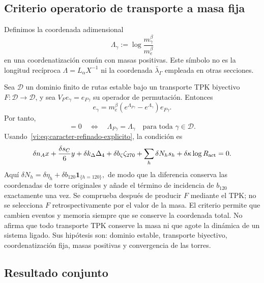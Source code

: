\subsection{Criterio operatorio de transporte a masa fija}

Definimos la coordenada adimensional
\begin{equation}
 \Lambda_\gamma:=\log\frac{m_\gamma^\beta}{m_e^\beta}
 \label{vi:eq:lambda-masa-ruta}
\end{equation}
en una coordenatización común con masas positivas. Este símbolo no es la longitud
recíproca $\Lambda=L_\alpha X^{-1}$ ni la coordenada
$\bar\lambda_\Gamma$ empleada en otras secciones.

Sea $\mathscr D$ un dominio finito de rutas estable bajo un transporte TPK
biyectivo $F:\mathscr D\to\mathscr D$, y sea
$V_Fe_\gamma=e_{F\gamma}$ su operador de permutación. Entonces
\begin{equation}
 [M^\beta,V_F]e_\gamma
 =m_e^\beta\left(e^{\Lambda_{F\gamma}}-e^{\Lambda_\gamma}\right)
 e_{F\gamma}.
 \label{vi:eq:conmutador-masa-transporte}
\end{equation}
Por tanto,
\begin{equation}
 [M^\beta,V_F]=0
 \quad\Longleftrightarrow\quad
 \Lambda_{F\gamma}=\Lambda_\gamma
 \quad\text{para toda }\gamma\in\mathscr D.
 \label{vi:eq:criterio-conservacion-masa}
\end{equation}
Usando~\eqref{vi:eq:caracter-refinado-explicito}, la condición es
\begin{equation}
 \delta n_Ax+\frac{\delta s_C}{6}y
 +\delta k_\Delta\Delta_4+\delta b_\zeta\zeta_{270}
 +\sum_h\delta N_hs_h
 +\delta\kappa\log R_{\rm act}=0.
 \label{vi:eq:balance-conservacion-masa}
\end{equation}
Aquí
\(
 \delta N_h=\delta\eta_h+
 \delta b_{120}\mathbf1_{\{h=120\}},
\)
de modo que la diferencia conserva las coordenadas de torre originales y
añade el término de incidencia de $b_{120}$ exactamente una vez.
Se comprueba después de producir $F$ mediante el TPK; no se selecciona
$F$ retrospectivamente por el valor de la masa. El criterio permite que
cambien eventos y memoria siempre que se conserve la coordenada total.
No afirma que todo transporte TPK conserve la masa ni que agote la dinámica
de un sistema ligado. Sus hipótesis son: dominio estable, transporte
biyectivo, coordenatización fija, masas positivas y convergencia de las torres.

\subsection{Resultado conjunto}

